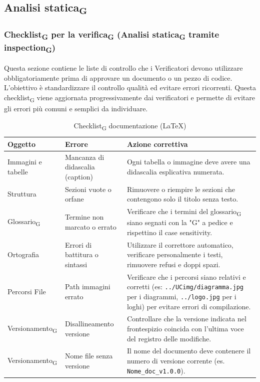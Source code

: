 \documentclass[11pt,a4paper]{article}
\newcommand{\gls}[1]{#1\textsubscript{G}}
\begin{document}
\subsection{\gls{Analisi statica}}

\subsubsection{\gls{Checklist} per la \gls{verifica} (\gls{Analisi statica} tramite inspection\textsubscript{G})}
Questa sezione contiene le liste di controllo che i Verificatori devono utilizzare obbligatoriamente prima di approvare un documento o un pezzo di codice. L'obiettivo è standardizzare il controllo qualità ed evitare errori ricorrenti.
Questa \gls{checklist} viene aggiornata progressivamente dai verificatori e permette di evitare gli errori più comuni e semplici da individuare.

\begin{table}[H]
    \centering
    \renewcommand{\arraystretch}{1.4}
    \begin{tabular}{|l|>{\raggedright\arraybackslash}p{}|>{\raggedright\arraybackslash}p{}|}
        \hline
        \textbf{Oggetto} & \textbf{Errore} & \textbf{Azione correttiva} \\
        \hline
        Immagini e tabelle & Mancanza di didascalia (caption) & Ogni tabella o immagine deve avere una didascalia esplicativa numerata. \\
        \hline
        Struttura & Sezioni vuote o orfane & Rimuovere o riempire le sezioni che contengono solo il titolo senza testo. \\
        \hline
        \gls{Glossario} & Termine non marcato o errato & Verificare che i termini del \gls{glossario} siano segnati con la "G" a pedice e rispettino il case sensitivity. \\
        \hline
        Ortografia & Errori di battitura o sintassi & Utilizzare il correttore automatico, verificare personalmente i testi, rimuovere refusi e doppi spazi. \\
        \hline
        Percorsi File & Path immagini errato & Verificare che i percorsi siano relativi e corretti (es: \texttt{../UCimg/diagramma.jpg} per i diagrammi, \texttt{../logo.jpg} per i loghi) per evitare errori di compilazione.\\
        \hline
        \gls{Versionamento} & Disallineamento versione & Controllare che la versione indicata nel frontespizio coincida con l'ultima voce del registro delle modifiche. \\
        \hline
        \gls{Versionamento} & Nome file senza versione & Il nome del documento deve contenere il numero di versione corrente (es. \texttt{Nome\_doc\_v1.0.0}). \\
        \hline
    \end{tabular}
    \caption{\gls{Checklist} documentazione (LaTeX)}
\end{table}
\end{document}
